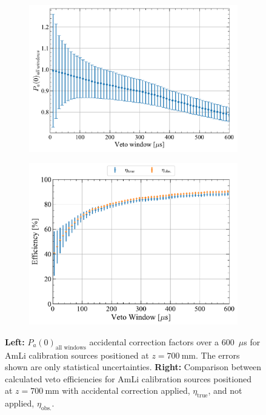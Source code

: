 \begin{figure}[!ht]
    \centering
    \begin{subfigure}[b]{0.49\textwidth}
        \centering
        \includegraphics[width=\textwidth]{figures/VetoEfficiency/SR3AmLi_700mm_Corrections_100k.pdf}
        \caption{}
        \label{fig:VetoEff/SR3AmLi_700mm_Corrections}
    \end{subfigure}
    \hfill
    \begin{subfigure}[b]{0.49\textwidth}
        \centering
        \includegraphics[width=\textwidth]{figures/VetoEfficiency/AmLiAccidentalCheck.pdf}
        \caption{}
        \label{fig:VetoEff/AmLiAccidentalCorrectionImpact}
    \end{subfigure}
    \caption{\textbf{Left:} $P_a(0)_{\text{all windows}}$ accidental correction factors over a 600~$\mu$s for AmLi calibration sources positioned at $z=700~\text{mm}$. The errors shown are only statistical uncertainties. \textbf{Right:} Comparison between calculated veto efficiencies for AmLi calibration sources positioned at $z=700~\text{mm}$ with accidental correction applied, $\eta_\text{true}$, and not applied, $\eta_\text{obs.}$.}
    \label{fig:VetoEff/AmLiAccidentalPlots}
\end{figure}


